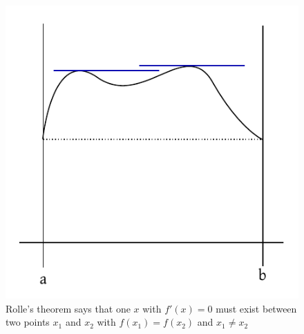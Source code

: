\documentclass[a4paper,landscape,twocolumn]{article}
\theoremstyle{definition}
\begin{document}
\begin{figure}[!h]
  \begin{center}
    \includegraphics{img/rolles_theorem.pdf}
    \caption{
      Rolle's theorem says that one $x$ with $f'(x) = 0$ must exist
      between two points $x_1$ and $x_2$ with $f(x_1) = f(x_2)$ and $x_1 \neq x_2$
    }
  \end{center}
\end{figure}
\end{document}
